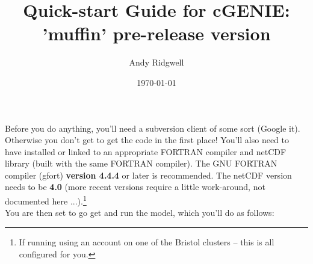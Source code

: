 \documentclass[10pt,twoside]{article}
\title{Quick-start Guide for cGENIE: 'muffin' pre-release version}
\author{Andy Ridgwell}
\date{\today}
\begin{document}

\maketitle


Before you do anything, you'll need a subversion client of some sort (Google it). Otherwise you don't get to get the code in the first place! You'll also need to have installed or linked to an appropriate FORTRAN compiler and netCDF library (built with the same FORTRAN compiler). The GNU FORTRAN compiler (gfort) \textbf{version 4.4.4} or later is recommended. The netCDF version needs to be \textbf{4.0} (more recent versions require a little work-around, not documented here ...).\footnote{If running using an account on one of the Bristol clusters -- this is all configured for you.}
\\ You are then set to go get and run the model, which you'll do as follows:
\end{document}
